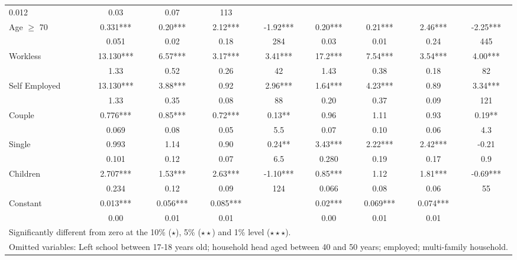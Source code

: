 \begin{table}
\begin{tabular}{l|cccc|cccc}
			    0.012   	&	0.03	&	0.07	&	113	\\
Age $\geq$ 70	&	       0.331***	&	       0.20***	&	       2.12***	&	-1.92***	&	       					0.20***	&	       0.21***	&	       2.46***	&	-2.25***	\\
                    	&	       0.051   	&	0.02	&	0.18	&	284	&	       0.03   	&	0.01	&	0.24	&	445	\\
Workless	&	       13.130***	&	       6.57***	&	       3.17***	&	3.41***	&	       						17.2***	&	       7.54***	&	       3.54***	&	4.00***	\\
	&	1.33	&	0.52	&	0.26	&	42	&	
	1.43	&	0.38	&	0.18	& 	82 \\
Self Employed	&	       13.130***	&	       3.88***	&	       0.92 &	2.96***	&	       							1.64***	&	       4.23***	&	       0.89 &	3.34***	\\
	&	1.33	&	0.35	&	0.08	&	88	&
		0.20	&	0.37	&	0.09		& 121	\\
Couple	&	      0.776***	&	       0.85***	&	      0.72***	&	0.13**	&	       						0.96	&	      1.11	&	      0.93	&	0.19**	\\
			&	0.069	&	0.08	&	0.05	&	5.5	&
			0.07	&	0.10	&	0.06		&4.3	\\
Single	&	     0.993	&	       1.14	&	      0.90	&	0.24**	&
		       3.43***	&	       2.22***	&	       2.42***	&	-0.21	\\
	&	0.101	&	0.12	&	0.07	&	6.5	&
		0.280	&	0.19	&	0.17		& 0.9	\\
Children	&	      2.707***	&	       1.53***	&	       2.63***	&	-1.10***	&	       					0.85***	&	       1.12	&	       1.81***	&	-0.69***	\\
	&	0.234	&	0.12	&	0.09	&	124	&	
		0.066	&	0.08	&	0.06		& 55	\\
Constant            	&	       0.013***	&	       0.056***	&	       0.085***	&		&	      					 0.02***	&	       0.069***	&	       0.074***	&		\\
                    	&	       0.00   	&	0.01	&	0.01	&		
		&	       0.00   	&	0.01	&	0.01	&		\\
\hline\hline
\multicolumn{9}{l}{Significantly different from zero at the  10\% ($\star$), 5\% ($\star\star$) and 1\% level ($\star\star\star$).} \\
\multicolumn{9}{l}{Omitted variables: Left school between 17-18 years old; household head aged between 40 and 50 years; employed; multi-family household. }
\end{tabular}
\label{table:multinom_incon}
\end{table}



